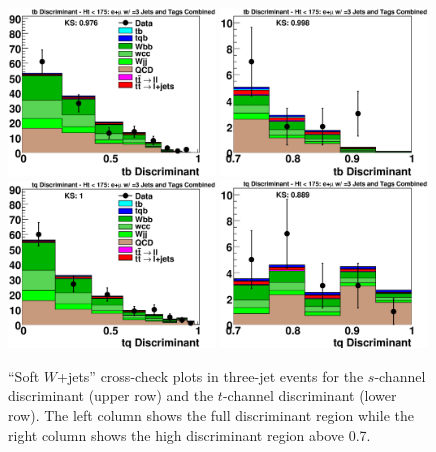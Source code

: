\clearpage
\begin{figure}[!h!tbp]
\includegraphics[width=0.49\textwidth]
{eps/MatrixElement/cross_check/combined/3jet/Wjets_tb_Discriminant}
\includegraphics[width=0.49\textwidth]
{eps/MatrixElement/cross_check/combined/3jet/Wjets_tb_Discriminant_Zoom}
\includegraphics[width=0.49\textwidth]
{eps/MatrixElement/cross_check/combined/3jet/Wjets_tq_Discriminant}
\includegraphics[width=0.49\textwidth]
{eps/MatrixElement/cross_check/combined/3jet/Wjets_tq_Discriminant_Zoom}
\vspace{-0.1in}
\caption{``Soft $W$+jets'' cross-check plots in three-jet
events for the $s$-channel discriminant (upper row) and the $t$-channel discriminant
(lower row). The left column shows the full discriminant region while
the right column shows the high discriminant region above 0.7.}
\label{wjets-cross-3jet}
\end{figure}

